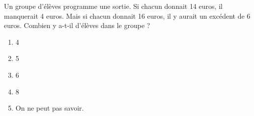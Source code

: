 Un groupe d'élèves programme une sortie. Si chacun donnait 14 euros, il manquerait 4 euros. Mais si chacun donnait 16 euros, il y aurait un excédent de 6 euros. Combien y a-t-il d'élèves dans le groupe ?
\begin{multicols}{5}
  \begin{enumerate}[A/]
  \item 4
  \item 5
  \item 6
  \item 8
  \item On ne peut pas savoir.
  \end{enumerate}
\end{multicols}